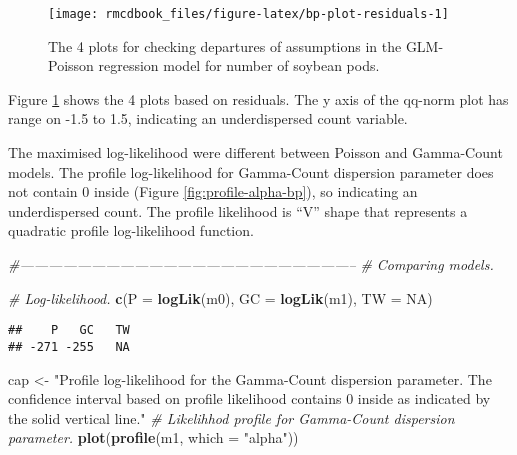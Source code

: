 \documentclass[9pt,a5paper,]{book}
\newenvironment{Shaded}{}{}
\newcommand{\KeywordTok}[1]{\textbf{{#1}}}
\newcommand{\DataTypeTok}[1]{\underline{{#1}}}
\newcommand{\StringTok}[1]{{#1}}
\newcommand{\CommentTok}[1]{\textit{{#1}}}
\newcommand{\OtherTok}[1]{{#1}}
\newcommand{\NormalTok}[1]{{#1}}
\renewenvironment{Shaded}{\color{inputcolor}}{}
\renewcommand{\DataTypeTok}[1]{{#1}}
\theoremstyle{definition}
\theoremstyle{definition}
\theoremstyle{remark}
\begin{document}
\begin{figure}[h]

{\centering \texttt{[image: rmcdbook\_files/figure-latex/bp-plot-residuals-1]} 

}

\caption{The 4 plots for checking departures of assumptions in the GLM-Poisson regression model for number of soybean pods.}\label{fig:bp-plot-residuals}
\end{figure}

Figure \ref{fig:bp-plot-residuals} shows the 4 plots based on residuals.
The y axis of the qq-norm plot has range on -1.5 to 1.5, indicating an
underdispersed count variable.

The maximised log-likelihood were different between Poisson and
Gamma-Count models. The profile log-likelihood for Gamma-Count
dispersion parameter does not contain 0 inside (Figure
\ref{fig:profile-alpha-bp}), so indicating an underdispersed count. The
profile likelihood is ``V'' shape that represents a quadratic profile
log-likelihood function.

\begin{Shaded}
\begin{Highlighting}[]
\CommentTok{#-----------------------------------------------------------------------}
\CommentTok{# Comparing models.}

\CommentTok{# Log-likelihood.}
\KeywordTok{c}\NormalTok{(}\DataTypeTok{P =} \KeywordTok{logLik}\NormalTok{(m0), }\DataTypeTok{GC =} \KeywordTok{logLik}\NormalTok{(m1), }\DataTypeTok{TW =} \OtherTok{NA}\NormalTok{)}
\end{Highlighting}
\end{Shaded}

\begin{verbatim}
##    P   GC   TW 
## -271 -255   NA
\end{verbatim}

\begin{Shaded}
\begin{Highlighting}[]
\NormalTok{cap <-}
\StringTok{    "Profile log-likelihood for the Gamma-Count dispersion parameter. The confidence interval based on profile likelihood contains 0 inside as indicated by the solid vertical line."}
\CommentTok{# Likelihhod profile for Gamma-Count dispersion parameter.}
\KeywordTok{plot}\NormalTok{(}\KeywordTok{profile}\NormalTok{(m1, }\DataTypeTok{which =} \StringTok{"alpha"}\NormalTok{))}
\end{Highlighting}
\end{Shaded}
\end{document}
